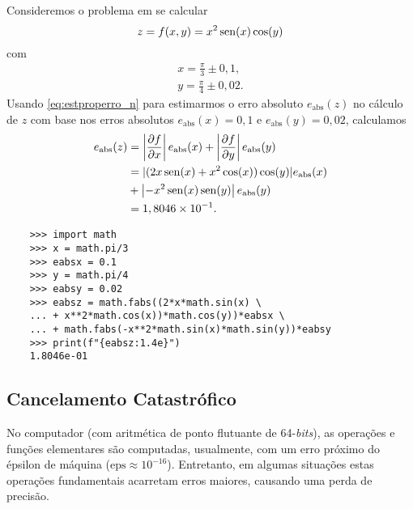
\begin{ex}\label{ex:properro_2}
  Consideremos o problema em se calcular
  \begin{equation}
    z = f(x,y) = x^2\operatorname{sen}(x)\cos(y)
  \end{equation}
  com
  \begin{gather}
    x = \frac{\pi}{3} \pm 0,1,\\
    y = \frac{\pi}{4} \pm 0,02.
  \end{gather}
  Usando \eqref{eq:estproperro_n} para estimarmos o erro absoluto $e_{\text{abs}}(z)$ no cálculo de $z$ com base nos erros absolutos $e_{\text{abs}}(x)=0,1$ e $e_{\text{abs}}(y)=0,02$, calculamos
  \begin{align}
    e_{\text{abs}}(z) &= \left|\frac{\partial f}{\partial x}\right|e_{\text{abs}}(x) + \left|\frac{\partial f}{\partial y}\right|e_{\text{abs}}(y)\\
                      &= |(2x\operatorname{sen}(x) + x^2\cos(x))\cos(y)|e_{\text{abs}}(x)\\
                      &+ \left|-x^2\operatorname{sen}(x)\operatorname{sen}(y)\right|e_{\text{abs}}(y)\\
                      &= 1,8046\times 10^{-1}.
  \end{align}
  
  
  \begin{lstlisting}
    >>> import math
    >>> x = math.pi/3
    >>> eabsx = 0.1
    >>> y = math.pi/4
    >>> eabsy = 0.02
    >>> eabsz = math.fabs((2*x*math.sin(x) \
    ... + x**2*math.cos(x))*math.cos(y))*eabsx \
    ... + math.fabs(-x**2*math.sin(x)*math.sin(y))*eabsy
    >>> print(f"{eabsz:1.4e}")
    1.8046e-01    
  \end{lstlisting}
  
\end{ex}


\subsection{Cancelamento Catastrófico}

No computador (com aritmética de ponto flutuante de 64-{\it bits}), as operações e funções elementares são computadas, usualmente, com um erro próximo do épsilon de máquina ($\mathrm{eps} \approx 10^{-16}$). Entretanto, em algumas situações estas operações fundamentais acarretam erros maiores, causando uma perda de precisão.

